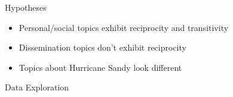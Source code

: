 \documentclass[10pt, xcolor=table]{beamer}
\theoremstyle{definition}
\theoremstyle{remark}
\begin{document}
\begin{frame}{Hypotheses}
\large
\begin{itemize}
\item Personal/social topics exhibit reciprocity and transitivity \vspace{.4cm}
\item Dissemination topics don't exhibit reciprocity\vspace{.4cm}
\item Topics about Hurricane Sandy look different
\end{itemize}

\end{frame}

\begin{frame}{Data Exploration}
\begin{center}
	\begin{minipage}{0.75\linewidth}


\end{minipage}
\end{center}
\end{frame}
\end{document}
